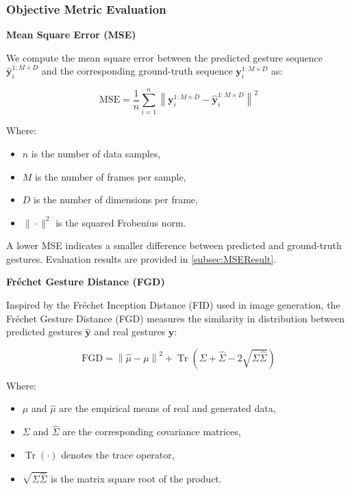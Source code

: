 
\subsubsection{Objective Metric Evaluation}

\textbf{Mean Square Error (MSE)}

We compute the mean square error between the predicted gesture sequence $\hat{\mathbf{y}}_i^{1:M \times D}$ and the corresponding ground-truth sequence $\mathbf{y}_i^{1:M \times D}$ as:

\begin{equation}
	\text{MSE} = \frac{1}{n} \sum_{i=1}^n \left\| \mathbf{y}_i^{1:M \times D} - \hat{\mathbf{y}}_i^{1:M \times D} \right\|^2
\end{equation}

Where:
\begin{itemize}
	\item $n$ is the number of data samples,
	\item $M$ is the number of frames per sample,
	\item $D$ is the number of dimensions per frame,
	\item $\|\cdot\|^2$ is the squared Frobenius norm.
\end{itemize}

A lower MSE indicates a smaller difference between predicted and ground-truth gestures. Evaluation results are provided in \autoref{subsec:MSEResult}.

\textbf{Fréchet Gesture Distance (FGD)}

Inspired by the Fréchet Inception Distance (FID) used in image generation, the Fréchet Gesture Distance (FGD) measures the similarity in distribution between predicted gestures $\hat{\mathbf{y}}$ and real gestures $\mathbf{y}$:

\begin{equation}
	\text{FGD} = \left\| \hat{\mu} - \mu \right\|^2 + \operatorname{Tr}\left( \Sigma + \hat{\Sigma} - 2 \sqrt{\Sigma \hat{\Sigma}} \right)
	\label{eq:fidscore}
\end{equation}

Where:
\begin{itemize}
	\item $\mu$ and $\hat{\mu}$ are the empirical means of real and generated data,
	\item $\Sigma$ and $\hat{\Sigma}$ are the corresponding covariance matrices,
	\item $\operatorname{Tr}(\cdot)$ denotes the trace operator,
	\item $\sqrt{\Sigma \hat{\Sigma}}$ is the matrix square root of the product.
\end{itemize}

